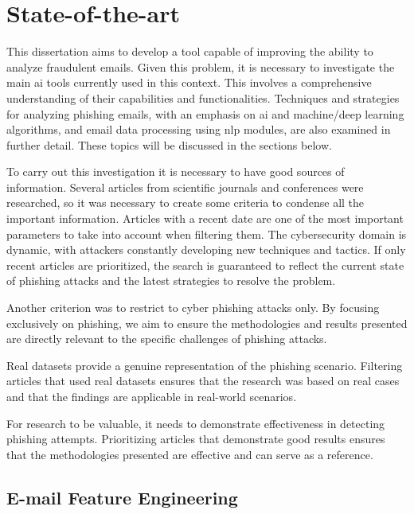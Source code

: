 \chapter{State-of-the-art}
\label{chapter:sota}


This dissertation aims to develop a tool capable of improving the ability to analyze fraudulent emails. Given this problem, it is necessary to investigate the main \ac{ai} tools currently used in this context. This involves a comprehensive understanding of their capabilities and functionalities. Techniques and strategies for analyzing phishing emails, with an emphasis on \ac{ai} and machine/deep learning algorithms, and email data processing using \ac{nlp} modules, are also examined in further detail. These topics will be discussed in the sections below.

To carry out this investigation it is necessary to have good sources of information. Several articles from scientific journals and conferences were researched, so it was necessary to create some criteria to condense all the important information.
Articles with a recent date are one of the most important parameters to take into account when filtering them. The cybersecurity domain is dynamic, with attackers constantly developing new techniques and tactics. If only recent articles are prioritized, the search is guaranteed to reflect the current state of phishing attacks and the latest strategies to resolve the problem.

Another criterion was to restrict to cyber phishing attacks only. By focusing exclusively on phishing, we aim to ensure the methodologies and results presented are directly relevant to the specific challenges of phishing attacks.

Real datasets provide a genuine representation of the phishing scenario. Filtering articles that used real datasets ensures that the research was based on real cases and that the findings are applicable in real-world scenarios.

For research to be valuable, it needs to demonstrate effectiveness in detecting phishing attempts. Prioritizing articles that demonstrate good results ensures that the methodologies presented are effective and can serve as a reference.

\section{E-mail Feature Engineering}

